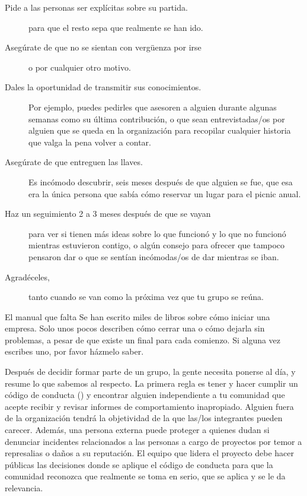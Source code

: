 \begin{description}

\item[Pide a las personas ser explícitas sobre su partida.]
  para que el resto sepa que realmente se han ido.

\item[Asegúrate de que no se sientan con vergüenza por irse]
  o por cualquier otro motivo.

\item[Dales la oportunidad de transmitir sus conocimientos.]
  Por ejemplo,
  puedes pedirles que asesoren a alguien durante algunas semanas como su última contribución,
  o que sean entrevistadas/os por alguien que se queda en la organización para recopilar cualquier historia que valga la pena volver a contar.

\item[Asegúrate de que entreguen las llaves.]
  Es incómodo descubrir, seis meses después de que alguien se fue,
  que esa era la única persona que sabía cómo reservar un lugar para el picnic anual.

\item[Haz un seguimiento 2 a 3 meses después de que se vayan]
  para ver si tienen más ideas sobre lo que funcionó y lo que no funcionó mientras estuvieron contigo,
  o algún consejo para ofrecer que tampoco pensaron dar
  o que se sentían incómodas/os de dar mientras se iban.

\item[Agradéceles,]
  tanto cuando se van como la próxima vez que tu grupo se reúna.

\end{description}

\begin{aside}{El manual que falta}
  Se han escrito miles de libros sobre cómo iniciar una empresa.
  Solo unos pocos describen cómo cerrar una o cómo dejarla sin problemas,
  a pesar de que existe un final para cada comienzo.
  Si alguna vez escribes uno,
  por favor házmelo saber.
\end{aside}


Después de decidir formar parte de un grupo,
la gente necesita ponerse al día,
y \cite{Shol2019} resume lo que sabemos al respecto.
La primera regla es tener y hacer cumplir un código de conducta ()
y encontrar alguien independiente a tu comunidad que acepte recibir y revisar informes de comportamiento inapropiado.
Alguien fuera de la organización tendrá la objetividad de la que las/los integrantes pueden carecer.
Además, una persona externa puede proteger a quienes dudan si denunciar incidentes relacionados a las personas
a cargo de proyectos por temor a represalias o daños a su reputación.
El equipo que lidera el proyecto debe hacer públicas las decisiones donde se aplique el código de conducta
para que la comunidad reconozca que realmente se toma en serio, que se aplica y se le da relevancia.

